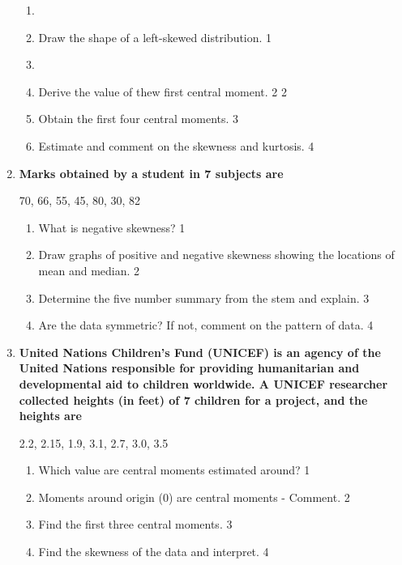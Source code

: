 \documentclass[a4paper,oneside]{book}
\begin{document}
\begin{enumerate}
  \begin{enumerate}
    \item
	\item Draw the shape of a left-skewed distribution. \hfill 1
    \item
	\item Derive the value of thew first central moment. \hfill 2 \hfill 2
    \item  
	Obtain the first four central moments. \hfill 3
    \item
	Estimate and comment on the skewness and kurtosis. \hfill 4
  \end{enumerate}

 \item
	  \textbf{Marks obtained by a student in 7 subjects are} 
	  \begin{center}
	  70, 66, 55, 45, 80, 30, 82
	\end{center}
  
  \begin{enumerate}
    \item
	What is negative skewness? \hfill 1
    \item
	Draw graphs of positive and negative skewness showing the locations of mean and median. \hfill 2
    \item  
	Determine the five number summary from the stem and explain. \hfill 3
    \item
	Are the data symmetric? If not, comment on the pattern of data. \hfill 4
\end{enumerate}

 \item
	  \textbf{United Nations Children's Fund (UNICEF) is an agency of the United Nations responsible for providing humanitarian and developmental aid to children worldwide. A  UNICEF researcher collected heights (in feet) of 7 children for a project, and the heights are} 

	\begin{center}
	  2.2, 2.15, 1.9, 3.1, 2.7, 3.0, 3.5
	  	\end{center}
  
  \begin{enumerate}
    \item
	Which value are central moments estimated around? \hfill 1
    \item
	Moments around origin (0) are central moments - Comment. \hfill 2
    \item  
	Find the first three central moments. \hfill 3
    \item
	Find the skewness of the data and interpret.  \hfill 4
  \end{enumerate}
  


\end{enumerate}
\end{document}
